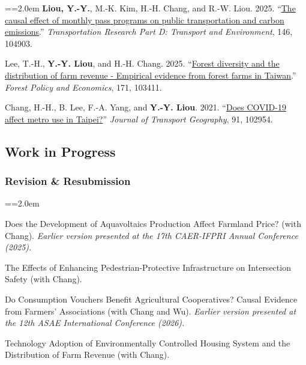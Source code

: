 \documentclass[11pt,letterpaper]{article}
\newenvironment{hanglist}{\par\setlength{\parindent}{0pt}\everypar={\hangindent=2.0em\hangafter=1}}{\par}
\begin{document}
\begin{hanglist}
\textbf{Liou, Y.-Y.}, M.-K. Kim, H.-H. Chang, and
R.-W. Liou. 2025. ``\href{https://doi.org/10.1016/j.trd.2025.104903}{The
causal effect of monthly pass programs on public transportation and
carbon emissions}.'' \emph{Transportation Research Part D: Transport and
Environment}, 146, 104903.

Lee, T.-H., \textbf{Y.-Y. Liou}, and H.-H. Chang.
2025. ``\href{https://doi.org/10.1016/j.forpol.2024.103411}{Forest
diversity and the distribution of farm revenue - Empirical evidence from
forest farms in Taiwan}.'' \emph{Forest Policy and Economics}, 171,
103411.

Chang, H.-H., B. Lee, F.-A. Yang, and
\textbf{Y.-Y. Liou}. 2021.
``\href{https://doi.org/10.1016/j.jtrangeo.2021.102954}{Does COVID-19
affect metro use in Taipei?}'' \emph{Journal of Transport Geography},
91, 102954.

\end{hanglist}

\subsection{Work in Progress}\label{work-in-progress}

\subsubsection{Revision \& Resubmission}\label{revision-resubmission}

\begin{hanglist}

Does the Development of Aquavoltaics Production
Affect Farmland Price? (with Chang).
\newline \textit{Earlier version presented at the 17th CAER-IFPRI Annual Conference (2025).}

The Effects of Enhancing Pedestrian-Protective
Infrastructure on Intersection Safety (with Chang).

Do Consumption Vouchers Benefit Agricultural
Cooperatives? Causal Evidence from Farmers' Associations (with Chang and
Wu).
\newline \textit{Earlier version presented at the 12th ASAE International Conference (2026).}

Technology Adoption of Environmentally Controlled
Housing System and the Distribution of Farm Revenue (with Chang).

\end{hanglist}
\end{document}
